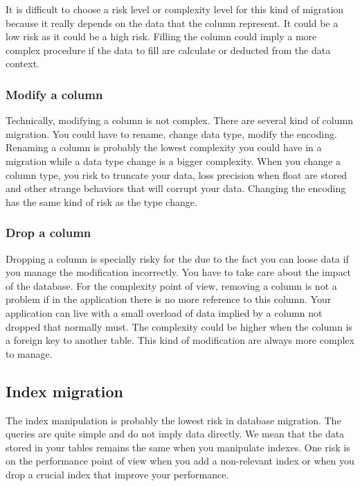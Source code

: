 It is difficult to choose a risk level or complexity level for this kind of migration because it really depends on the data that the column represent. It could be a low risk as it could be a high risk. Filling the column could imply a more complex procedure if the data to fill are calculate or deducted from the data context.

\subsubsection{Modify a column\\}

Technically, modifying a column is not complex. There are several kind of column migration. You could have to rename, change data type, modify the encoding. Renaming a column is probably the lowest complexity you could have in a migration while a data type change is a bigger complexity. When you change a column type, you risk to truncate your data, loss precision when float are stored and other strange behaviors that will corrupt your data. Changing the encoding has the same kind of risk as the type change.

\subsubsection{Drop a column\\}

Dropping a column is specially risky for the due to the fact you can loose data if you manage the modification incorrectly. You have to take care about the impact of the database. For the complexity point of view, removing a column is not a problem if in the application there is no more reference to this column. Your application can live with a small overload of data implied by a column not dropped that normally must. The complexity could be higher when the column is a foreign key to another table. This kind of modification are always more complex to manage.

\subsection{Index migration}

The index manipulation is probably the lowest risk in database migration. The queries are quite simple and do not imply data directly. We mean that the data stored in your tables remains the same when you manipulate indexes. One risk is on the performance point of view when you add a non-relevant index or when you drop a crucial index that improve your performance.


